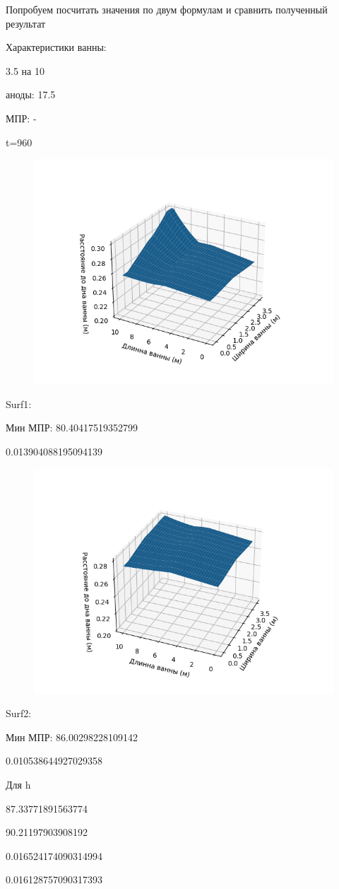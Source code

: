 \documentclass{article}
\begin{document}
Попробуем посчитать значения по двум формулам и сравнить полученный результат

Характеристики ванны:

3.5 на 10

аноды: 17.5

МПР: -

t=960



\begin{figure}[H]
\centering
\includegraphics[width=0.8\linewidth]{surf1.png}
\caption[]{}
\label{fig:elec}
\end{figure}

Surf1:

Мин МПР: 80.40417519352799

0.013904088195094139

\begin{figure}[H]
\centering
\includegraphics[width=0.8\linewidth]{surf2.png}
\caption[]{}
\label{fig:elec}
\end{figure}

Surf2:

Мин МПР: 86.00298228109142

0.010538644927029358


Для h

87.33771891563774

90.21197903908192

0.016524174090314994

0.016128757090317393
\end{document}
